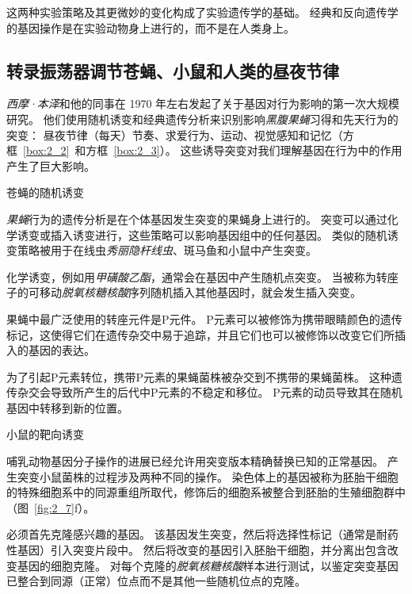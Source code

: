 这两种实验策略及其更微妙的变化构成了实验遗传学的基础。
经典和反向遗传学的基因操作是在实验动物身上进行的，而不是在人类身上。



\subsection{转录振荡器调节苍蝇、小鼠和人类的昼夜节律}

\textit{西摩·本泽}和他的同事在 1970 年左右发起了关于基因对行为影响的第一次大规模研究。
他们使用随机诱变和经典遗传分析来识别影响\textit{黑腹果蝇}习得和先天行为的突变：
昼夜节律（每天）节奏、求爱行为、运动、视觉感知和记忆（方框~\ref{box:2_2}~和方框~\ref{box:2_3}）。
这些诱导突变对我们理解基因在行为中的作用产生了巨大影响。


\begin{proposition}[在实验动物中产生突变] \label{box:2_2}
	
	\quad \quad 苍蝇的随机诱变
	
	\quad \quad \textit{果蝇}行为的遗传分析是在个体基因发生突变的果蝇身上进行的。
	突变可以通过化学诱变或插入诱变进行，这些策略可以影响基因组中的任何基因。
	类似的随机诱变策略被用于在线虫\textit{秀丽隐杆线虫}、斑马鱼和小鼠中产生突变。
	
	\quad \quad 化学诱变，例如用\textit{甲磺酸乙酯}，通常会在基因中产生随机点突变。
	当被称为转座子的可移动\textit{脱氧核糖核酸}序列随机插入其他基因时，就会发生插入突变。
	
	\quad \quad 果蝇中最广泛使用的转座元件是P元件。
	P元素可以被修饰为携带眼睛颜色的遗传标记，这使得它们在遗传杂交中易于追踪，并且它们也可以被修饰以改变它们所插入的基因的表达。
	
	\quad \quad 为了引起P元素转位，携带P元素的果蝇菌株被杂交到不携带的果蝇菌株。
	这种遗传杂交会导致所产生的后代中P元素的不稳定和移位。
	P元素的动员导致其在随机基因中转移到新的位置。
	
	\quad \quad 小鼠的靶向诱变
	
	\quad \quad 哺乳动物基因分子操作的进展已经允许用突变版本精确替换已知的正常基因。
	产生突变小鼠菌株的过程涉及两种不同的操作。
	染色体上的基因被称为胚胎干细胞的特殊细胞系中的同源重组所取代，修饰后的细胞系被整合到胚胎的生殖细胞群中（图~\ref{fig:2_7}f）。
	
	\quad \quad 必须首先克隆感兴趣的基因。
	该基因发生突变，然后将选择性标记（通常是耐药性基因）引入突变片段中。
	然后将改变的基因引入胚胎干细胞，并分离出包含改变基因的细胞克隆。
	对每个克隆的\textit{脱氧核糖核酸}样本进行测试，以鉴定突变基因已整合到同源（正常）位点而不是其他一些随机位点的克隆。
	

\end{proposition}
